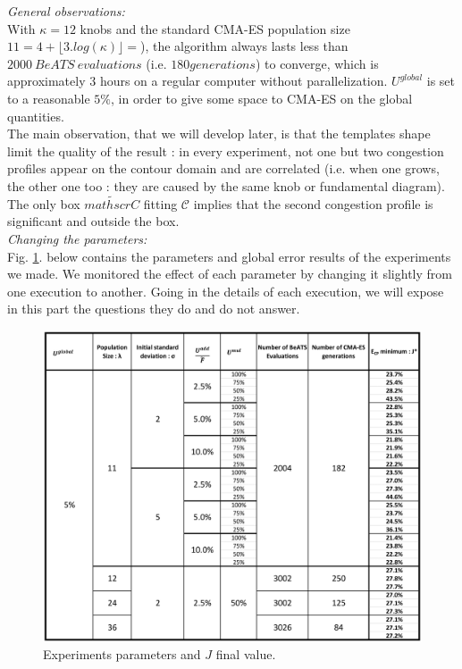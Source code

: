 \emph{General observations:}\\
With $\kappa=12$ knobs and the standard CMA-ES population size $11=4+\lfloor3.log(\kappa)\rfloor=$), the algorithm always lasts less than $2000\ BeATS\ evaluations$ (i.e. $180 generations$) to converge, which is  approximately 3 hours on a regular computer without parallelization.
$U^{global}$ is set to a reasonable $5\%$, in order to give some space to CMA-ES on the global quantities.\\
The main observation, that we will develop later, is that the templates shape limit the quality of the result : in every experiment, not one but two congestion profiles appear on the contour domain and are correlated (i.e. when one grows, the other one too : they are caused by the same knob or fundamental diagram). The only box $\widetilde{mathscr{C}}$ fitting $\mathscr{C}$ implies that the second congestion profile is significant and outside the box.\\
\emph{Changing the parameters:}\\
Fig. \ref{fig:results_array}. below contains the parameters and global error results of the experiments we made. We monitored the effect of each parameter by changing it slightly from one execution to another. Going in the details of each execution, we will expose in this part the questions they do and do not answer.\\
\begin{figure}
\centering
	\label{fig:results_array}
	\caption{Experiments parameters and $J$ final value.}
	\includegraphics[width=7in]{figures/results_array.png}
\end{figure}




